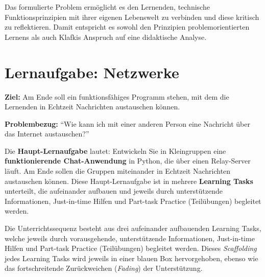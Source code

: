Das formulierte Problem ermöglicht es den Lernenden, technische Funktionsprinzipien mit ihrer eigenen Lebenswelt zu verbinden und diese kritisch zu reflektieren. Damit entspricht es sowohl den Prinzipien problemorientierten Lernens als auch Klafkis Anspruch auf eine didaktische Analyse.\clearpage

\chapter{Lernaufgabe: Netzwerke}
\textbf{Ziel:} Am Ende soll ein funktionsfähiges Programm stehen, mit dem die Lernenden in Echtzeit Nachrichten austauschen können.

\textbf{Problembezug:} \enquote{Wie kann ich mit einer anderen Person eine Nachricht über das Internet austauschen?}

\begin{mainBox}[title=Komplexe Lernaufgabe: Chat-Anwendung]
    Die \textbf{Haupt-Lernaufgabe} lautet: Entwickeln Sie in Kleingruppen eine \textbf{funktionierende Chat-Anwendung} in Python, die über einen Relay-Server läuft. Am Ende sollen die Gruppen miteinander in Echtzeit Nachrichten austauschen können. Diese Haupt-Lernaufgabe ist in mehrere \textbf{Learning Tasks} unterteilt, die aufeinander aufbauen und jeweils durch unterstützende Informationen, Just-in-time Hilfen und Part-task Practice (Teilübungen) begleitet werden.
\end{mainBox}

\begin{scaffoldBox}[title=Scaffolding der Lernaufgaben]
    Die Unterrichtssequenz besteht aus drei aufeinander aufbauenden Learning Tasks, welche jeweils durch vorausgehende, unterstützende Informationen, Just-in-time Hilfen und Part-task Practice (Teilübungen) begleitet werden. Dieses \textit{Scaffolding} jedes Learning Tasks wird jeweils in einer blauen Box hervorgehoben, ebenso wie das fortschreitende Zurückweichen (\textit{Fading}) der Unterstützung.
\end{scaffoldBox}

